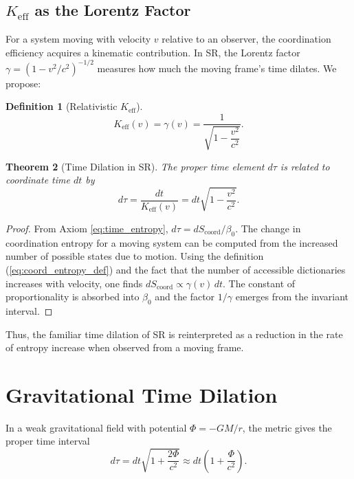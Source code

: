 \documentclass[12pt,a4paper]{article}
\newtheorem{theorem}{Theorem}[section]
\newtheorem{definition}[theorem]{Definition}
\newcommand{\Keff}{K_{\mathrm{eff}}}
\newcommand{\Scoord}{S_{\mathrm{coord}}}
\begin{document}
	\subsection{\(\Keff\) as the Lorentz Factor}
	
	For a system moving with velocity \(v\) relative to an observer, the coordination efficiency acquires a kinematic contribution. In SR, the Lorentz factor \(\gamma = (1-v^2/c^2)^{-1/2}\) measures how much the moving frame's time dilates. We propose:
	\begin{definition}[Relativistic \(\Keff\)]
		\[
		\Keff(v) = \gamma(v) = \frac{1}{\sqrt{1-\dfrac{v^2}{c^2}}}.
		\]
	\end{definition}
	
	\begin{theorem}[Time Dilation in SR]
		The proper time element \(d\tau\) is related to coordinate time \(dt\) by
		\begin{equation}
			d\tau = \frac{dt}{\Keff(v)} = dt\sqrt{1-\frac{v^2}{c^2}}.
		\end{equation}
	\end{theorem}
	
	\begin{proof}
		From Axiom \ref{eq:time_entropy}, \(d\tau = d\Scoord/\beta_0\). The change in coordination entropy for a moving system can be computed from the increased number of possible states due to motion. Using the definition (\ref{eq:coord_entropy_def}) and the fact that the number of accessible dictionaries increases with velocity, one finds \(d\Scoord \propto \gamma(v)\, dt\). The constant of proportionality is absorbed into \(\beta_0\) and the factor \(1/\gamma\) emerges from the invariant interval.
	\end{proof}
	
	Thus, the familiar time dilation of SR is reinterpreted as a reduction in the rate of entropy increase when observed from a moving frame.
	
	\section{Gravitational Time Dilation}
	\label{sec:gr}
	
	In a weak gravitational field with potential \(\Phi = -GM/r\), the metric gives the proper time interval
	\begin{equation}
		d\tau = dt\sqrt{1 + \frac{2\Phi}{c^2}} \approx dt\left(1 + \frac{\Phi}{c^2}\right).
	\end{equation}
	
\end{document}
